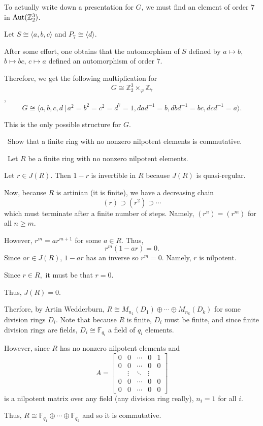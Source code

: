 \documentclass[12pt]{AlgebraQual}
\begin{document}
\begin{solution}
\begin{enumerate}[label=(\alph*)]
    To actually write down a presentation for $G$, we must find an element of order $7$ in $\text{Aut}(\mathbb{Z}_2^3)$.

    Let $S\cong\langle a,b,c\rangle$ and $P_7\cong\langle d\rangle.$

    After some effort, one obtains that the automorphism of $S$ defined by $a\mapsto b$, $b\mapsto bc$, $c\mapsto a$ defined an automorphism of order $7.$

    Therefore, we get the following multiplication for $$G\cong\mathbb{Z}_2^3\times_\varphi\mathbb{Z}_7$$, $$G\cong\langle a,b,c,d\,|\, a^2=b^2=c^2=d^7=1,dad^{-1}=b,dbd^{-1}=bc,dcd^{-1}=a\rangle.$$

    This is the only possible structure for $G.$
\end{enumerate}
\end{solution}
\newpage


\begin{problem} $\,$
Show that a finite ring with no nonzero nilpotent elements is commutative.
\end{problem}


\begin{solution}$\,$
Let $R$ be a finite ring with no nonzero nilpotent elements.

Let $r\in J(R)$. Then $1-r$ is invertible in $R$ because $J(R)$ is quasi-regular.

Now, because $R$ is artinian (it is finite), we have a decreasing chain $$(r)\supset(r^2)\supset\cdots$$ which must terminate after a finite number of steps. Namely, $(r^n)=(r^m)$ for all $n\ge m$.

However, $r^m=ar^{m+1}$ for some $a\in R$. Thus, $$r^m(1-ar)=0.$$ Since $ar\in J(R)$, $1-ar$ has an inverse so $r^m=0$. Namely, $r$ is nilpotent.

Since $r\in R,$ it must be that $r=0.$

Thus, $J(R)=0.$

Therfore, by Artin Wedderburn, $R\cong M_{n_1}(D_1)\oplus\cdots\oplus M_{n_k}(D_k)$ for some division rings $D_i.$ Note that because $R$ is finite, $D_i$ must be finite, and since finite division rings are fields, $D_i\cong\mathbb{F}_{q_i}$ a field of $q_i$ elements.

However, since $R$ has no nonzero nilpotent elements and $$A=\begin{bmatrix}
0 & 0 & \cdots & 0 & 1\\
0 & 0 &\cdots & 0 & 0\\
& \vdots & \ddots & \vdots & \\
0 & 0 & \cdots & 0 & 0\\
0 & 0 & \cdots & 0 & 0
\end{bmatrix}$$ is a nilpotent matrix over any field (any division ring really), $n_i=1$ for all $i.$

Thus, $R\cong \mathbb{F}_{q_1}\oplus\cdots\oplus \mathbb{F}_{q_k}$ and so it is commutative.
\end{solution}
\newpage
\end{document}
